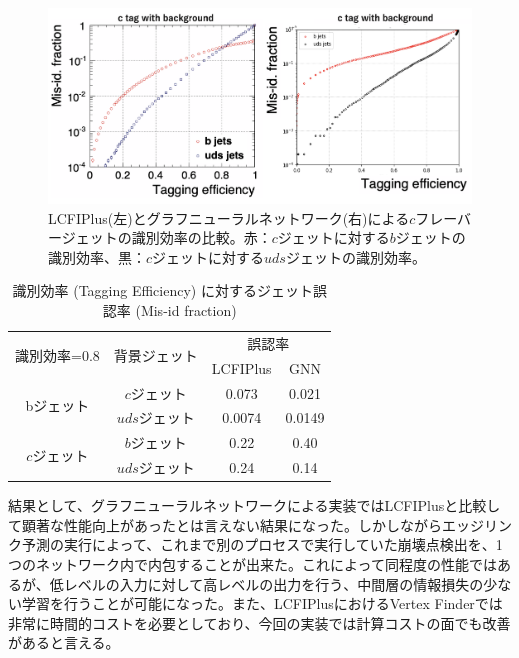 \begin{figure}[H]
	\begin{center}
 \includegraphics[keepaspectratio, scale=0.33]
 	{Figure/Flavortagging/gnneff_c.png}
 		\caption[LCFIPlusとGATのc-tagに関する比較]{LCFIPlus(左)とグラフニューラルネットワーク(右)による$c$フレーバージェットの識別効率の比較。赤：$c$ジェットに対する$b$ジェットの識別効率、黒：$c$ジェットに対する$uds$ジェットの識別効率。}
 		\label{gnneff_c}
	\end{center}
\end{figure}

\begin{table}[H]
 \centering
  \begin{tabular}{ |c|c|c|c|}
   \hline
   \multirow{2}{*}{識別効率=0.8} & \multirow{2}{*}{背景ジェット} & \multicolumn{2}{c|}{誤認率} \\ \cline{3-4} 
    & & LCFIPlus & GNN\\ \cline{3-4} 
    \hline \hline
   \multirow{2}{*}{bジェット} & $c$ジェット & 0.073 & 0.021\\ \cline{2-4} 
   & $uds$ジェット & 0.0074 & 0.0149\\ \cline{1-4} 
   \multirow{2}{*}{$c$ジェット} & $b$ジェット & 0.22 & 0.40\\ \cline{2-4} 
   & $uds$ジェット & 0.24 & 0.14\\
   \hline
  \end{tabular}
  \caption{識別効率 (Tagging Efficiency) に対するジェット誤認率 (Mis-id fraction)}
  \label{gnn_lcfi}
\end{table}
結果として、グラフニューラルネットワークによる実装ではLCFIPlusと比較して顕著な性能向上があったとは言えない結果になった。しかしながらエッジリンク予測の実行によって、これまで別のプロセスで実行していた崩壊点検出を、1つのネットワーク内で内包することが出来た。これによって同程度の性能ではあるが、低レベルの入力に対して高レベルの出力を行う、中間層の情報損失の少ない学習を行うことが可能になった。また、LCFIPlusにおけるVertex Finderでは非常に時間的コストを必要としており、今回の実装では計算コストの面でも改善があると言える。